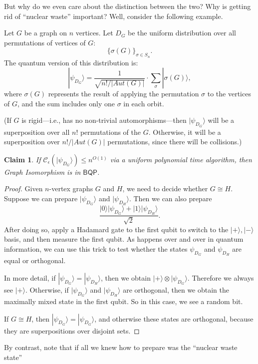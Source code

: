 \documentclass[11pt]{report}
\theoremstyle{plain}
\newtheorem{claim}[theorem]{Claim}
\theoremstyle{definition}
\renewcommand{\ket}[1]{|#1\rangle}
\newcommand{\tensor}{\otimes}
\newcommand{\sizee}{\ensuremath{\mathcal{C}_\epsilon}}
\begin{document}
But why do we even care about the distinction between the two?  Why is getting rid of ``nuclear waste'' important?  Well, consider the following example.

Let $G$ be a graph on $n$ vertices. Let $D_G$ be the uniform distribution over all permutations of vertices of $G$:
\[
\{\sigma(G)\}_{\sigma \in S_n}.
\]
The quantum version of this distribution is:
\[
\ket{\psi_{D_G}} = \frac{1}{\sqrt{n!/|Aut(G)|}} \cdot \sum_{\sigma} \ket{\sigma(G)},
\]
where $\sigma(G)$ represents the result of applying the permutation $\sigma$ to the vertices of $G$, and the sum includes only one $\sigma$ in each orbit.

(If $G$ is rigid---i.e., has no non-trivial automorphisms---then $\ket{\psi_{D_G}}$ will be a superposition over all $n!$ permutations of the $G$.  Otherwise, it will be a superposition over $n!/|Aut(G)|$ permutations, since there will be collisions.)

\begin{claim}
\label{gibqp}
If  $\sizee(\ket{\psi_{D_G}}) \leq n^{O(1)}$ via a uniform polynomial time algorithm, then Graph Isomorphism is in $\mathsf{BQP}$.
\end{claim}

\begin{proof}
Given $n$-vertex graphs $G$ and $H$, we need to decide whether $G \cong H$.  Suppose we can prepare $\ket{\psi_{D_G}}$ and $\ket{\psi_{D_H}}$.  Then we can also prepare
\[
\frac{\ket{0} \ket{\psi_{D_G}} + \ket{1} \ket{\psi_{D_H}}}{\sqrt{2}}.
\]
After doing so, apply a Hadamard gate to the first qubit to switch to the $\ket+, \ket-$ basis, and then measure the first qubit.  As happens over and over in quantum information, we can use this trick to test whether the states $\psi_{D_G}$ and $\psi_{D_H}$ are equal or orthogonal.

In more detail, if $\ket{\psi_{D_G}} = \ket{\psi_{D_H}}$, then we obtain $\ket+\tensor\ket{\psi_{D_G}}$. Therefore we always see $\ket+$. Otherwise, if $\ket{\psi_{D_G}}$ and $\ket{\psi_{D_H}}$ are orthogonal, then we obtain the maximally mixed state in the first qubit.  So in this case, we see a random bit.

If $G \cong H$, then $\ket{\psi_{D_G}}=\ket{\psi_{D_G}}$, and otherwise these states are orthogonal, because they are superpositions over disjoint sets.
\end{proof}

By contrast, note that if all we knew how to prepare was the ``nuclear waste state''
\end{document}

